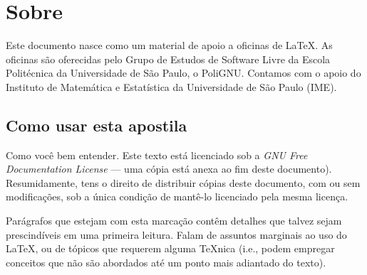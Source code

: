 \section*{Sobre}

Este documento nasce como um material de apoio a oficinas de
\LaTeX. As oficinas são oferecidas pelo Grupo de Estudos de Software
Livre da Escola Politécnica da Universidade de São Paulo, o PoliGNU.
Contamos com o apoio do Instituto de Matemática e Estatística da
Universidade de São Paulo (IME).

\subsection*{Como usar esta apostila}

Como você bem entender. Este texto está licenciado sob a \emph{GNU Free
Documentation License} --- uma cópia está anexa ao fim deste documento).
Resumidamente, tens o direito de distribuir cópias deste documento,
com ou sem modificações, sob a única condição de mantê-lo licenciado
pela mesma licença.

\begin{detalhe}
Parágrafos que estejam com esta marcação contêm detalhes que talvez
sejam prescindíveis em uma primeira leitura. Falam de assuntos
marginais ao uso do \LaTeX, ou de tópicos que requerem alguma
\TeX nica (i.e., podem empregar conceitos que não são abordados até
um ponto mais adiantado do texto).
\end{detalhe}

\clearpage
